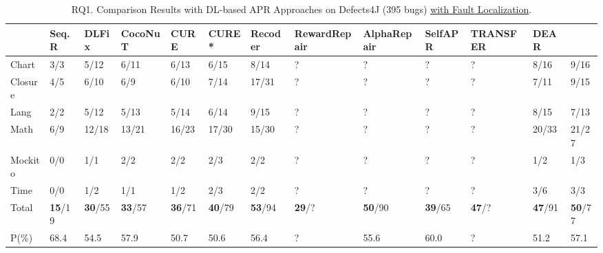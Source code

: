 



\begin{table*}[t]
  \caption{RQ1. Comparison Results with DL-based APR Approaches on Defects4J (395 bugs) \underline {with Fault Localization}.}
  \vspace{-6pt}
         {\footnotesize
        \tabcolsep 2.5pt
			\begin{center}
				\renewcommand{\arraystretch}{1}
				\begin{tabular}{p{1cm}<{\centering}|p{1cm}<{\centering}|p{1cm}<{\centering}|p{1.5cm}<{\centering}|p{1cm}<{\centering}|p{1cm}<{\centering}|p{1cm}<{\centering}|p{2cm}<{\centering}|p{1.5cm}<{\centering}|p{1cm}<{\centering}|p{1.5cm}<{\centering}|p{1cm}<{\centering}|p{1cm}<{\centering}}
					
					\hline
					&\textbf{Seq.R}&\textbf{DLFix}& \textbf{CocoNuT}&\textbf{CURE}&\textbf{CURE*}&\textbf{Recoder}& {\bf RewardRepair} & \textbf{AlphaRepair}& \textbf{SelfAPR}& \textbf{TRANSFER}& {\bf DEAR} & \textbf{\tool}\\
					\hline
					Chart  & 3/3   & 5/12  & 6/11  & 6/13  & 6/15 & 8/14& ? &? &? &? & 8/16 & 9/16\\
					Closure& 4/5   & 6/10  & 6/9   & 6/10  & 7/14 & 17/31 & ? &?&? &? & 7/11 & 9/15\\
					Lang   & 2/2   & 5/12  & 5/13  & 5/14  & 6/14  & 9/15 & ? & ?&? &? & 8/15 & 7/13\\
					Math    & 6/9  & 12/18 & 13/21 & 16/23 & 17/30 & 15/30 & ? & ?&? &? & 20/33 & 21/27\\
					Mockito & 0/0   & 1/1   & 2/2   & 2/2  & 2/3  & 2/2 & ? & ?&?&?& 1/2 & 1/3\\
					Time    & 0/0   & 1/2   & 1/1   & 1/2  & 2/3 & 2/2 &? & ? &?&?& 3/6 & 3/3\\
					\hline
					Total   & {\bf 15}/19 & {\bf 30}/55 & {\bf 33}/57 & {\bf 36}/71 & {\bf 40}/79 & {\bf 53}/94 & {\bf 29}/? & {\bf 50}/90 & {\bf 39}/65 &{\bf 47}/? &{\bf 47}/91 & {\bf 50}/77\\
					\hline
					P(\%)  & 68.4  & 54.5  & 57.9  & 50.7  & 50.6 & 56.4& ? & 55.6 & 60.0 & ?& 51.2 & 57.1\\
					\hline
				\end{tabular}
				\label{RQ1_defects4J_with_FL}
			\end{center}
                }
		\end{table*}


